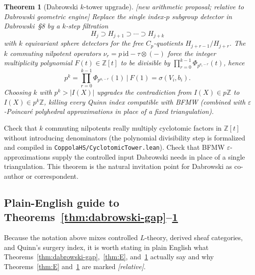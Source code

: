 \documentclass[11pt]{article}
\newtheorem{theorem}{Theorem}[section]
\theoremstyle{definition}
\newcommand{\status}[1]{\textit{\textcolor{black!70}{[#1]}}}
\begin{document}
\begin{theorem}[Dabrowski $k$-tower upgrade]
\label{thm:F}
\status{new arithmetic proposal; relative to Dabrowski geometric engine}
Replace the single index-$p$ subgroup detector in Dabrowski~\S8 by a
$k$-step filtration
\[
H_j\supset H_{j+1}\supset\cdots\supset H_{j+k}
\]
with $k$ equivariant sphere detectors for the free $C_p$-quotients
$H_{j+r-1}/H_{j+r}$.  The $k$ commuting nilpotent operators
$\nu_r=p\,\mathrm{id}-\tau\otimes(-)$ force the integer multiplicity
polynomial $F(t)\in\mathbb{Z}[t]$ to be divisible by
$\prod_{r=0}^{k-1}\Phi_{p^{a_i-r}}(t)$, hence
\[
p^k=\prod_{r=0}^{k-1}\Phi_{p^{a_i-r}}(1)\ \Big|\ F(1)=\sigma(V_i,b_i).
\]
Choosing $k$ with $p^k>|I(X)|$ upgrades the contradiction from
$I(X)\in p\mathbb{Z}$ to $I(X)\in p^k\mathbb{Z}$, killing every Quinn index
compatible with BFMW (combined with $\varepsilon$-Poincar\'e polyhedral
approximations in place of a fixed triangulation).
\end{theorem}

\begin{checkboxenv}
Check that $k$ commuting nilpotents really multiply cyclotomic factors in
$\mathbb{Z}[t]$ without introducing denominators (the polynomial divisibility
step is formalized and compiled in \texttt{CoppolaHS/CyclotomicTower.lean}).
Check that BFMW $\varepsilon$-approximations supply the controlled input
Dabrowski needs in place of a single triangulation.  This theorem is the
natural invitation point for Dabrowski as co-author or correspondent.
\end{checkboxenv}

\subsection{Plain-English guide to Theorems~\ref{thm:dabrowski-gap}--\ref{thm:F}}
\label{sec:plain-english}

Because the notation above mixes controlled $L$-theory, derived sheaf
categories, and Quinn's surgery index, it is worth stating in plain English
what Theorems~\ref{thm:dabrowski-gap},~\ref{thm:E}, and~\ref{thm:F} actually
say and why Theorems~\ref{thm:E} and~\ref{thm:F} are marked \status{relative}.
\end{document}

